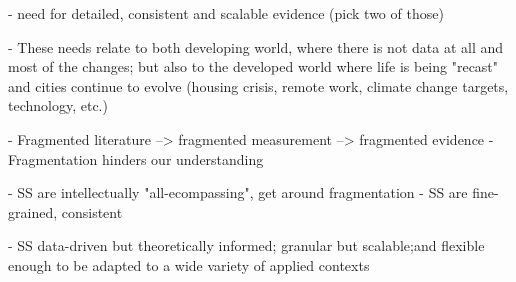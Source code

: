 








- need for detailed, consistent and scalable evidence (pick two of those)

- These needs relate to both developing world, where there is not data at all
  and most of the changes; but also to the developed world where life is being
  "recast" and cities continue to evolve (housing crisis, remote work, climate
  change targets, technology, etc.)

- Fragmented literature --> fragmented measurement --> fragmented evidence
- Fragmentation hinders our understanding

- SS are intellectually "all-ecompassing", get around fragmentation
- SS are fine-grained, consistent

- SS data-driven but theoretically informed; granular but scalable;and flexible enough to be adapted to a wide variety of applied contexts



